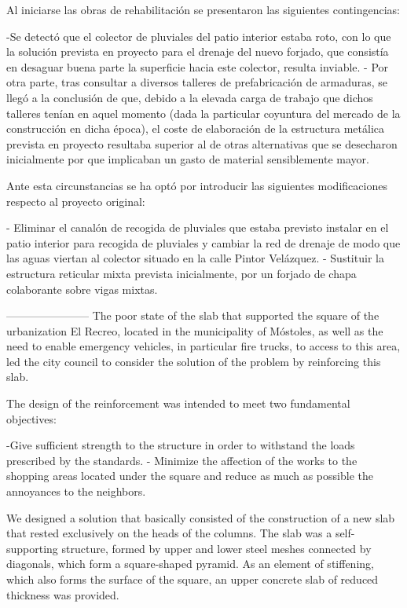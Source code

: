 Al iniciarse las obras de rehabilitación  se presentaron las siguientes contingencias:

-Se detectó que el colector de pluviales del patio interior estaba roto, con lo que la solución prevista en proyecto para el drenaje del nuevo forjado, que consistía en desaguar buena parte la superficie hacia este colector, resulta inviable.
- Por otra parte, tras consultar a diversos talleres de prefabricación de armaduras, se llegó a la conclusión de que, debido a la elevada carga de trabajo que dichos talleres tenían en aquel momento (dada la particular coyuntura del mercado de la construcción en dicha época), el coste de elaboración de la estructura metálica prevista en proyecto resultaba superior al de otras alternativas que se desecharon inicialmente por que implicaban un gasto de material sensiblemente mayor. 


Ante esta circunstancias se ha optó por introducir las siguientes modificaciones respecto al proyecto original:

- Eliminar el canalón de recogida de pluviales que estaba previsto instalar en el patio interior para recogida de pluviales y cambiar la red de drenaje de modo que las aguas viertan al colector situado en la calle Pintor Velázquez.
- Sustituir la estructura reticular mixta prevista inicialmente, por un forjado de chapa colaborante sobre vigas mixtas.



-----------------------
The poor state of the slab that supported the square of the urbanization El Recreo, located in the municipality of Móstoles, as well as the need to enable emergency vehicles, in particular fire trucks, to access to this area, led the city council to consider the solution of the problem by reinforcing this slab.

The design of the reinforcement was intended to meet two fundamental objectives:

-Give sufficient strength to the structure in order to withstand the loads prescribed by the standards.
- Minimize the affection of the works to the shopping areas located under the square and reduce as much as possible the annoyances to the neighbors.

We designed a solution that basically consisted of the construction of a new slab that rested exclusively on the heads of the columns. The slab was a self-supporting structure, formed by upper and lower steel meshes connected by diagonals, which form a square-shaped pyramid. As an element of stiffening, which also forms the surface of the square, an upper concrete slab of reduced thickness was provided.

